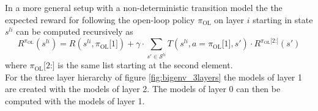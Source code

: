 In a more general setup with a non-deterministic transition model the the expected reward for following the open-loop policy $\pi_\text{OL}$ on layer $i$ starting in state $s^{li}$ can be computed recursively as 
\begin{equation}\label{eq:R_OL}
    R^{\pi_\text{OL}}\left( s^{li} \right) = R\left(s^{li}, \pi_\text{OL}\texttt{[$1$]}\right) + \gamma \cdot \sum_{s'\in \mathcal{S}^{li}}T\left( s^{li}, a=\pi_\text{OL}\texttt{[$1$]}, s' \right)\cdot R^{\pi_\text{OL}\texttt{[$2$:]}}\left( s' \right)
\end{equation}
where $\pi_\text{OL}\texttt{[$2$:]}$ is the same list starting at the second element.\\
For the three layer hierarchy of figure \ref{fig:bigenv_3layers} the models of layer 1 are created with the models of layer 2. The models of layer 0 can then be computed with the models of layer 1.\\

